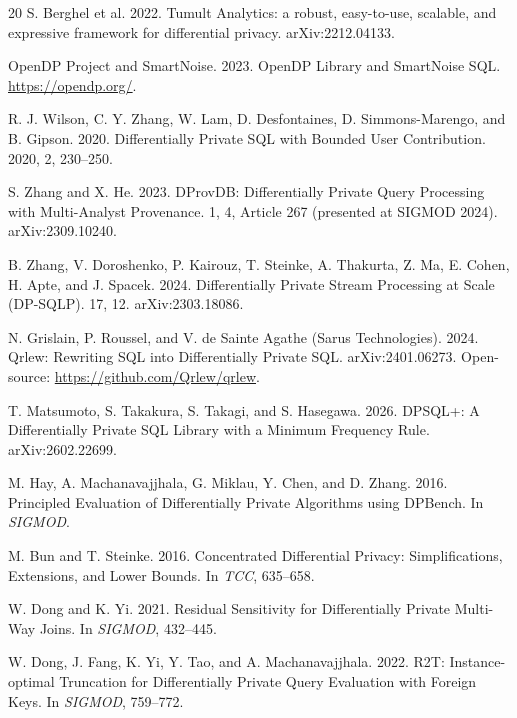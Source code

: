 \documentclass[sigconf,nonacm]{acmart}
\begin{document}
\begin{thebibliography}{20}
S. Berghel et al. 2022.
\newblock Tumult Analytics: a robust, easy-to-use, scalable, and expressive framework for differential privacy.
\newblock arXiv:2212.04133.

OpenDP Project and SmartNoise. 2023.
\newblock OpenDP Library and SmartNoise SQL.
\newblock \url{https://opendp.org/}.

R. J. Wilson, C. Y. Zhang, W. Lam, D. Desfontaines, D. Simmons-Marengo, and B. Gipson. 2020.
\newblock Differentially Private SQL with Bounded User Contribution.
 2020, 2, 230--250.

S. Zhang and X. He. 2023.
\newblock DProvDB: Differentially Private Query Processing with Multi-Analyst Provenance.
 1, 4, Article 267 (presented at SIGMOD 2024). arXiv:2309.10240.

B. Zhang, V. Doroshenko, P. Kairouz, T. Steinke, A. Thakurta, Z. Ma, E. Cohen, H. Apte, and J. Spacek. 2024.
\newblock Differentially Private Stream Processing at Scale (DP-SQLP).
 17, 12. arXiv:2303.18086.

N. Grislain, P. Roussel, and V. de Sainte Agathe (Sarus Technologies). 2024.
\newblock Qrlew: Rewriting SQL into Differentially Private SQL.
\newblock arXiv:2401.06273. Open-source: \url{https://github.com/Qrlew/qrlew}.

T. Matsumoto, S. Takakura, S. Takagi, and S. Hasegawa. 2026.
\newblock DPSQL+: A Differentially Private SQL Library with a Minimum Frequency Rule.
\newblock arXiv:2602.22699.

M. Hay, A. Machanavajjhala, G. Miklau, Y. Chen, and D. Zhang. 2016.
\newblock Principled Evaluation of Differentially Private Algorithms using DPBench.
\newblock In {\em SIGMOD}.

M. Bun and T. Steinke. 2016.
\newblock Concentrated Differential Privacy: Simplifications, Extensions, and Lower Bounds.
\newblock In {\em TCC}, 635--658.

W. Dong and K. Yi. 2021.
\newblock Residual Sensitivity for Differentially Private Multi-Way Joins.
\newblock In {\em SIGMOD}, 432--445.

W. Dong, J. Fang, K. Yi, Y. Tao, and A. Machanavajjhala. 2022.
\newblock R2T: Instance-optimal Truncation for Differentially Private Query Evaluation with Foreign Keys.
\newblock In {\em SIGMOD}, 759--772.


\end{thebibliography}
\end{document}
